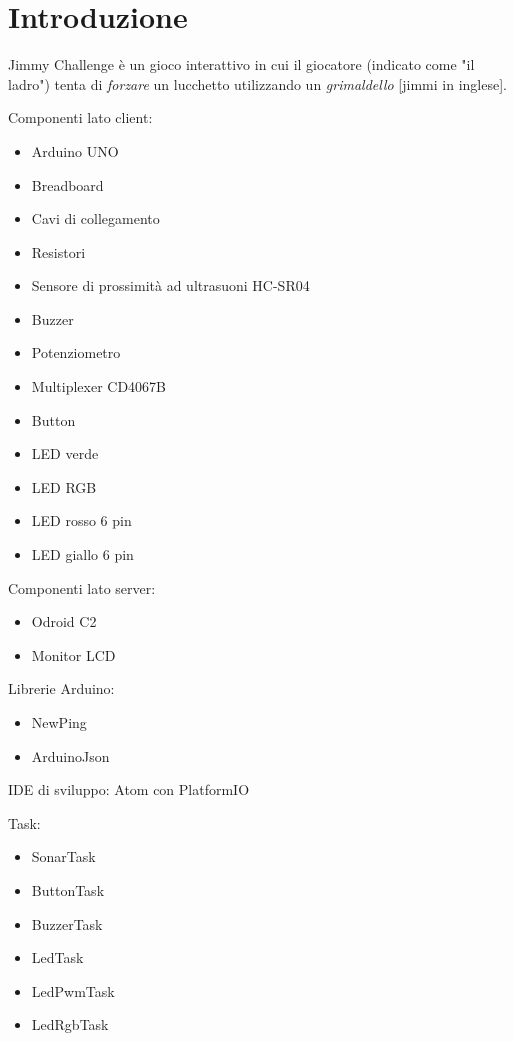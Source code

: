 \chapter{Introduzione}

Jimmy Challenge è un gioco interattivo in cui il giocatore (indicato come "il ladro") tenta di \textit{forzare} un lucchetto utilizzando un \textit{grimaldello} [jimmi in inglese].


Componenti lato client:
\begin{itemize}
	\item Arduino UNO
	\item Breadboard
	\item Cavi di collegamento
	\item Resistori
	\item Sensore di prossimità ad ultrasuoni HC-SR04
	\item Buzzer
	\item Potenziometro
	\item Multiplexer CD4067B
	\item Button
	\item LED verde
	\item LED RGB
	\item LED rosso 6 pin
	\item LED giallo 6 pin
\end{itemize}

Componenti lato server:
\begin{itemize}
	\item Odroid C2
	\item Monitor LCD
\end{itemize}

Librerie Arduino:
\begin{itemize}
	\item NewPing
	\item ArduinoJson
\end{itemize}

IDE di sviluppo: Atom con PlatformIO

Task:
\begin{itemize}
	\item SonarTask
	\item ButtonTask
	\item BuzzerTask
	\item LedTask
	\item LedPwmTask
	\item LedRgbTask
\end{itemize}